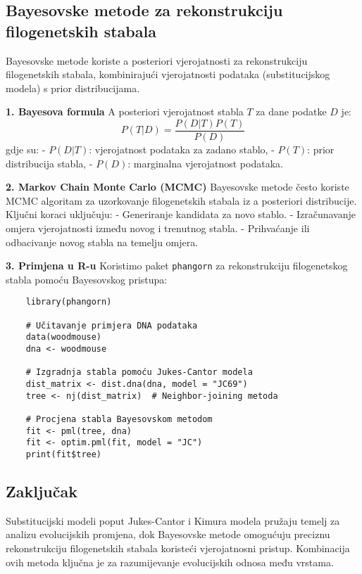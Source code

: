 \documentclass[10pt,a4paper,twoside]{article}
\begin{document}
\subsection*{Bayesovske metode za rekonstrukciju filogenetskih stabala}

Bayesovske metode koriste a posteriori vjerojatnosti za rekonstrukciju filogenetskih stabala, kombinirajući vjerojatnosti podataka (substitucijskog modela) s prior distribucijama.

\textbf{1. Bayesova formula}  
A posteriori vjerojatnost stabla \( T \) za dane podatke \( D \) je:
\[
P(T | D) = \frac{P(D | T) P(T)}{P(D)}
\]
gdje su:
- \( P(D | T) \): vjerojatnost podataka za zadano stablo,
- \( P(T) \): prior distribucija stabla,
- \( P(D) \): marginalna vjerojatnost podataka.

\textbf{2. Markov Chain Monte Carlo (MCMC)}  
Bayesovske metode često koriste MCMC algoritam za uzorkovanje filogenetskih stabala iz a posteriori distribucije. Ključni koraci uključuju:
- Generiranje kandidata za novo stablo.
- Izračunavanje omjera vjerojatnosti između novog i trenutnog stabla.
- Prihvaćanje ili odbacivanje novog stabla na temelju omjera.

\textbf{3. Primjena u R-u}  
Koristimo paket \texttt{phangorn} za rekonstrukciju filogenetskog stabla pomoću Bayesovskog pristupa:

\begin{verbatim}
	library(phangorn)
	
	# Učitavanje primjera DNA podataka
	data(woodmouse)
	dna <- woodmouse
	
	# Izgradnja stabla pomoću Jukes-Cantor modela
	dist_matrix <- dist.dna(dna, model = "JC69")
	tree <- nj(dist_matrix)  # Neighbor-joining metoda
	
	# Procjena stabla Bayesovskom metodom
	fit <- pml(tree, dna)
	fit <- optim.pml(fit, model = "JC")
	print(fit$tree)
\end{verbatim}

\subsection*{Zaključak}

Substitucijski modeli poput Jukes-Cantor i Kimura modela pružaju temelj za analizu evolucijskih promjena, dok Bayesovske metode omogućuju preciznu rekonstrukciju filogenetskih stabala koristeći vjerojatnosni pristup. Kombinacija ovih metoda ključna je za razumijevanje evolucijskih odnosa među vrstama.
\end{document}
